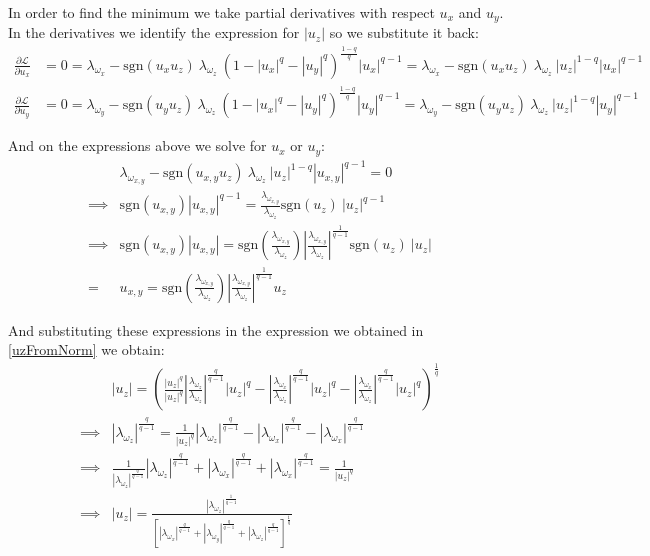 In order to find the minimum we take partial derivatives with respect $u_x$ and $u_y$. In the derivatives we identify the expression for $|u_z|$ so we substitute it back: 
\begin{align}
\label{partialLx}
\frac{\partial \mathcal{L}}{\partial u_x} &= 0 =\lambda_{\omega_x} - \text{sgn}(u_x u_z) \ \lambda_{\omega_z} \ (1 - |u_x|^q - |u_y|^q)^{\frac{1-q}{q}} |u_x|^{q-1} = \lambda_{\omega_x} - \text{sgn}(u_x u_z) \ \lambda_{\omega_z} \ |u_z|^{1-q} |u_x|^{q-1}\\
\label{partialLy}
\frac{\partial \mathcal{L}}{\partial u_y} &= 0 = \lambda_{\omega_y} - \text{sgn}(u_y u_z) \ \lambda_{\omega_z} \ (1 - |u_x|^q - |u_y|^q)^{\frac{1-q}{q}} |u_y|^{q-1} = \lambda_{\omega_y} - \text{sgn}(u_y u_z) \ \lambda_{\omega_z} \ |u_z|^{1-q} |u_y|^{q-1}
\end{align}

And on the expressions above we solve for $u_x$ or $u_y$:
\begin{align}
&\lambda_{\omega_{x,y}} - \text{sgn}(u_{x,y} u_z) \ \lambda_{\omega_z} \ |u_z|^{1-q} |u_{x,y}|^{q-1} = 0 \\
\implies &
\text{sgn}(u_{x,y}) |u_{x,y}|^{q-1} = \frac{\lambda_{\omega_{x,y}}}{\lambda_{\omega_z}} \text{sgn}(u_z) \ |u_z|^{q-1} \\
\implies &
\text{sgn}(u_{x,y}) |u_{x,y}| = \text{sgn}\left(\frac{\lambda_{\omega_{x,y}}}{\lambda_{\omega_z}}\right) \left|\frac{\lambda_{\omega_{x,y}}}{\lambda_{\omega_z}}\right|^{\frac{1}{q-1}}
 \text{sgn}(u_z) \ |u_z| \\
= &
\label{uxyFromuz}
u_{x,y} = \text{sgn}\left(\frac{\lambda_{\omega_{x,y}}}{\lambda_{\omega_z}}\right) \left|\frac{\lambda_{\omega_{x,y}}}{\lambda_{\omega_z}}\right|^{\frac{1}{q-1}}
u_z
\end{align}

And substituting these expressions in the expression we obtained in \ref{uzFromNorm} we obtain:
\begin{align}
& |u_z| = 
\left(
\frac{|u_z|^q}{|u_z|^q} \left|\frac{\lambda_{\omega_{z}}}{\lambda_{\omega_z}}\right|^{\frac{q}{q-1}}
|u_z|^q- \left|\frac{\lambda_{\omega_{x}}}{\lambda_{\omega_z}}\right|^{\frac{q}{q-1}}
|u_z|^q - \left|\frac{\lambda_{\omega_{x}}}{\lambda_{\omega_z}}\right|^{\frac{q}{q-1}}
|u_z|^q
\right)^{\frac{1}{q}} \\
\implies & 
|\lambda_{\omega_z}|^{\frac{q}{q-1}} = 
\frac{1}{|u_z|^q} |\lambda_{\omega_{z}}|^{\frac{q}{q-1}}
- |\lambda_{\omega_{x}}|^{\frac{q}{q-1}}
- |\lambda_{\omega_{x}}|^{\frac{q}{q-1}}
\\ \implies &
\frac{1}{|\lambda_{\omega_{z}}|^{\frac{q}{q-1}}}
|\lambda_{\omega_z}|^{\frac{q}{q-1}} + |\lambda_{\omega_{x}}|^{\frac{q}{q-1}}
+ |\lambda_{\omega_{x}}|^{\frac{q}{q-1}} = 
\frac{1}{|u_z|^q}
\\ \implies &
|u_z| = 
\frac{|\lambda_{\omega_{z}}|^{\frac{1}{q-1}}}
{\left[ |\lambda_{\omega_x}|^{\frac{q}{q-1}} + |\lambda_{\omega_y}|^{\frac{q}{q-1}} + |\lambda_{\omega_z}|^{\frac{q}{q-1}}\right]^\frac{1}{q}}
\end{align}

